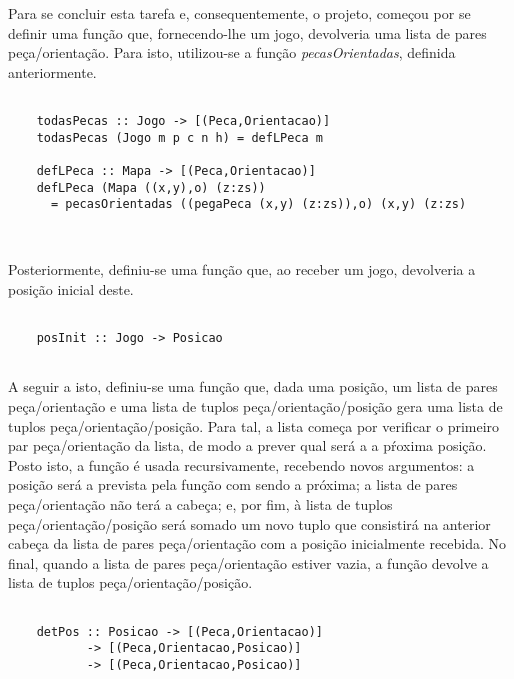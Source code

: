 \documentclass[a4paper]{report} %
\begin{document}
  \par \noindent Para se concluir esta tarefa e, consequentemente, o projeto, começou por se definir uma função que, fornecendo-lhe um jogo, devolveria uma lista de pares peça/orientação. Para isto, utilizou-se a função \textit{pecasOrientadas}, definida anteriormente.
  
  \begin{verbatim}
      
    todasPecas :: Jogo -> [(Peca,Orientacao)]
    todasPecas (Jogo m p c n h) = defLPeca m
    
    defLPeca :: Mapa -> [(Peca,Orientacao)]
    defLPeca (Mapa ((x,y),o) (z:zs)) 
      = pecasOrientadas ((pegaPeca (x,y) (z:zs)),o) (x,y) (z:zs)
  
      
  \end{verbatim}
  
  \par \noindent Posteriormente, definiu-se uma função que, ao receber um jogo, devolveria a posição inicial deste.
  
  \begin{verbatim}
      
    posInit :: Jogo -> Posicao  
      
  \end{verbatim}
  
  \par \noindent A seguir a isto, definiu-se uma função que, dada uma posição, um lista de pares peça/orientação e uma lista de tuplos peça/orientação/posição gera  uma lista de tuplos peça/orientação/posição. Para tal, a lista começa por verificar o primeiro par peça/orientação da lista, de modo a prever qual será a a pŕoxima posição. Posto isto, a função é usada recursivamente, recebendo novos argumentos: a posição será a prevista pela função com sendo a próxima; a lista de pares peça/orientação não terá a cabeça; e, por fim, à lista de tuplos peça/orientação/posição será somado um novo tuplo que consistirá na anterior cabeça da lista de pares peça/orientação com a posição inicialmente recebida. No final, quando a lista de pares peça/orientação estiver vazia, a função devolve a lista de tuplos peça/orientação/posição.
  
  \begin{verbatim}
      
    detPos :: Posicao -> [(Peca,Orientacao)]
           -> [(Peca,Orientacao,Posicao)] 
           -> [(Peca,Orientacao,Posicao)]  
      
  \end{verbatim}
  
\end{document}
